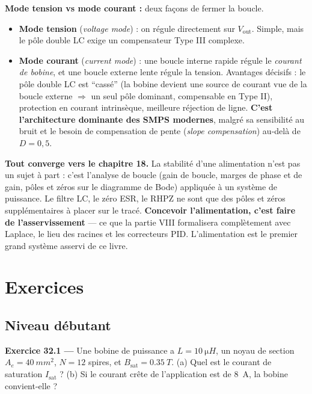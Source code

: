 \documentclass[12pt,a4paper,twoside]{book}
\begin{document}
\begin{formule}
\textbf{Mode tension vs mode courant :} deux façons de fermer la boucle.
\begin{itemize}[nosep]
\item \textbf{Mode tension} (\textit{voltage mode}) : on régule directement sur $V_{\text{out}}$. Simple, mais le pôle double LC exige un compensateur Type III complexe.
\item \textbf{Mode courant} (\textit{current mode}) : une boucle interne rapide régule le \textit{courant de bobine}, et une boucle externe lente régule la tension. Avantages décisifs : le pôle double LC est ``cassé'' (la bobine devient une source de courant vue de la boucle externe $\Rightarrow$ un seul pôle dominant, compensable en Type II), protection en courant intrinsèque, meilleure réjection de ligne. \textbf{C'est l'architecture dominante des SMPS modernes}, malgré sa sensibilité au bruit et le besoin de compensation de pente (\textit{slope compensation}) au-delà de $D = 0{,}5$.
\end{itemize}
\end{formule}

\begin{intuition}
\textbf{Tout converge vers le chapitre 18.} La stabilité d'une alimentation n'est pas un sujet à part : c'est l'analyse de boucle (gain de boucle, marges de phase et de gain, pôles et zéros sur le diagramme de Bode) appliquée à un système de puissance. Le filtre LC, le zéro ESR, le RHPZ ne sont que des pôles et zéros supplémentaires à placer sur le tracé. \textbf{Concevoir l'alimentation, c'est faire de l'asservissement} --- ce que la partie VIII formalisera complètement avec Laplace, le lieu des racines et les correcteurs PID. L'alimentation est le premier grand système asservi de ce livre.
\end{intuition}

\section*{Exercices}

\subsection*{Niveau débutant}

\textbf{Exercice 32.1 ---} Une bobine de puissance a $L = \SI{10}{\micro H}$, un noyau de section $A_e = \SI{40}{mm^2}$, $N = 12$ spires, et $B_{\text{sat}} = \SI{0.35}{T}$. (a) Quel est le courant de saturation $I_{\text{sat}}$ ? (b) Si le courant crête de l'application est de \SI{8}{A}, la bobine convient-elle ?
\end{document}
